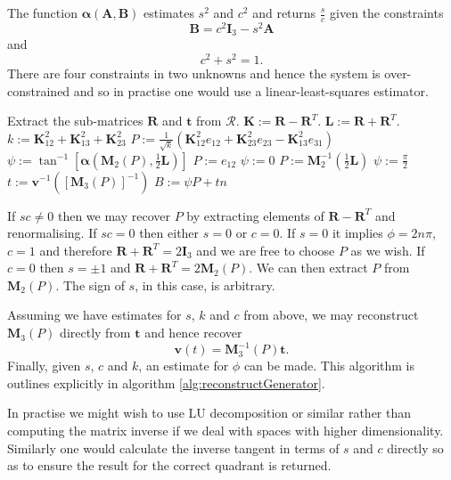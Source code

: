 \begin{definition}
The function $\mathbf{\alpha}(\mathbf{A},\mathbf{B})$ estimates $s^2$ 
and $c^2$ and returns $\frac{s}{c}$ given the constraints
\[
\mathbf{B} = c^2 \mathbf{I}_3 - s^2\mathbf{A}
\]
and
\[
c^2 + s^2 = 1.
\]
There are four constraints in two unknowns and hence the system is over-constrained and
so in practise one would use a linear-least-squares estimator.
\end{definition}

\begin{fancyalg}
\begin{algorithmic}[1]
\STATE Extract the sub-matrices $\mathbf{R}$ and $\mathbf{t}$ from $\mathcal{R}$.
\STATE $\mathbf{K} := \mathbf{R} - \mathbf{R}^T$.
\STATE $\mathbf{L} := \mathbf{R} + \mathbf{R}^T$.
\STATE $k := \mathbf{K}^2_{12} + \mathbf{K}^2_{13} + \mathbf{K}^2_{23} $
\STATE $P := \frac{1}{\sqrt{k}}\left(\mathbf{K}^2_{12}e_{12} + \mathbf{K}^2_{23}e_{23} - \mathbf{K}^2_{13}e_{31}\right)$
\STATE $\psi := \tan^{-1}\left[\mathbf{\alpha}\left(\mathbf{M}_2(P), \frac{1}{2}\mathbf{L}\right)\right]$
\ELSE
{}
\STATE $P := e_{12}$
\STATE $\psi := 0$
\ELSE
\STATE $P := \mathbf{M}^{-1}_2\left(\frac{1}{2}\mathbf{L}\right)$
\STATE $\psi := \frac{\pi}{2}$
\ENDIF
\ENDIF
\STATE $t := \mathbf{v}^{-1}\left(\left[\mathbf{M}_3(P)\right]^{-1}\right)$
\STATE $B := \psi P + tn$
\end{algorithmic}
\caption{Reconstruction of a generator from a $4\times4$ transformation matrix.%
\label{alg:reconstructGenerator}}
\end{fancyalg}

If $sc \ne 0$ then we may recover $P$ by extracting elements of 
$\mathbf{R} - \mathbf{R}^{T}$ and renormalising. If $sc = 0$ then either
$s = 0$ or $c = 0$. If $s = 0$ it implies $\phi = 2n\pi$, $c = 1$ and 
therefore
$\mathbf{R} + \mathbf{R}^{T} = 2\mathbf{I}_3$ and
we are free to choose $P$ as we wish. If $c = 0$ then $s = \pm 1$
and $\mathbf{R} + \mathbf{R}^{T} = 2 \mathbf{M}_2(P)$. We can then
extract $P$ from $\mathbf{M}_2(P)$. The sign of $s$, in this case, is arbitrary.

Assuming we have estimates for $s$, $k$ and $c$ from above, we may
reconstruct $\mathbf{M}_3(P)$ directly from $\mathbf{t}$ and hence recover
\[
\mathbf{v}(t) = \mathbf{M}^{-1}_3(P) \mathbf{t}.
\]
Finally, given $s$, $c$ and $k$, an estimate for 
$\phi$ can be made. This algorithm is outlines explicitly in algorithm 
\ref{alg:reconstructGenerator}.

In practise we might wish to use LU decomposition or similar rather
than computing the matrix inverse if we deal with spaces with higher
dimensionality. Similarly one would calculate the inverse tangent in terms
of $s$ and $c$ directly so as to ensure the result for the correct quadrant is
returned.
